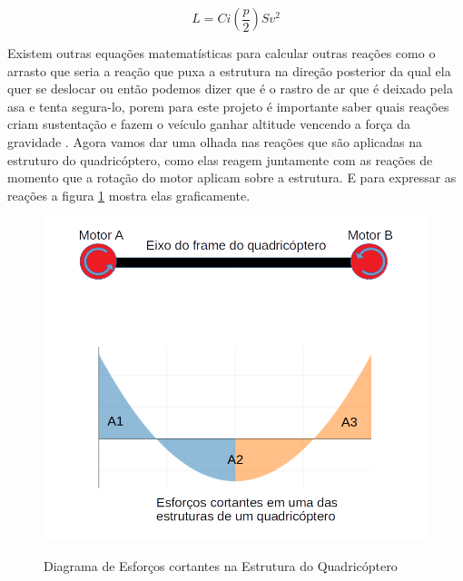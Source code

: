 \begin{equation}
    \label{sust}
    L=Ci\left(\frac{p}{2}\right)Sv^2
\end{equation}

Existem outras equações matematísticas para calcular outras reações como o arrasto que seria a reação que puxa a estrutura na direção posterior da qual ela quer se deslocar ou então podemos dizer que é o rastro de ar que é deixado pela asa e tenta segura-lo, porem para este projeto é importante saber quais reações criam sustentação e fazem o veículo ganhar altitude vencendo a força da gravidade \cite{inproceedings}.
Agora vamos dar uma olhada nas reações que são aplicadas na estruturo do quadricóptero, como elas reagem juntamente com as reações de momento que a rotação do motor aplicam sobre a estrutura. E para expressar as reações a figura \ref{fig:esfcort} mostra elas graficamente. 

\begin{figure}[htpb]
  \centering
  \caption{Diagrama de Esforços cortantes na Estrutura do Quadricóptero}
  \includegraphics[scale=.3]{figs/esfcortante.png}
  \label{fig:esfcort}
\end{figure}


